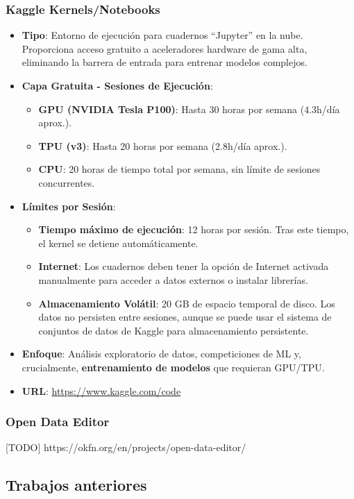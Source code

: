 \subsubsection*{Kaggle Kernels/Notebooks}
\begin{itemize}
	\item \textbf{Tipo}: Entorno de ejecución para cuadernos ``Jupyter'' en la nube. Proporciona acceso gratuito a aceleradores hardware de gama alta, eliminando la barrera de entrada para entrenar modelos complejos.
	\item \textbf{Capa Gratuita - Sesiones de Ejecución}:
	\begin{itemize}
		\item \textbf{GPU (NVIDIA Tesla P100)}: Hasta 30 horas por semana (4.3h/día aprox.).
		\item \textbf{TPU (v3)}: Hasta 20 horas por semana (2.8h/día aprox.).
		\item \textbf{CPU}: 20 horas de tiempo total por semana, sin límite de sesiones concurrentes.
	\end{itemize}
	\item \textbf{Límites por Sesión}:
	\begin{itemize}
		\item \textbf{Tiempo máximo de ejecución}: 12 horas por sesión. Tras este tiempo, el kernel se detiene automáticamente.
		\item \textbf{Internet}: Los cuadernos deben tener la opción de Internet activada manualmente para acceder a datos externos o instalar librerías.
		\item \textbf{Almacenamiento Volátil}: 20 GB de espacio temporal de disco. Los datos no persisten entre sesiones, aunque se puede usar el sistema de conjuntos de datos de Kaggle para almacenamiento persistente.
	\end{itemize}
	\item \textbf{Enfoque}: Análisis exploratorio de datos, competiciones de ML y, crucialmente, \textbf{entrenamiento de modelos} que requieran GPU/TPU.
	\item \textbf{URL}: \url{https://www.kaggle.com/code}
\end{itemize}

\subsubsection*{Open Data Editor}
[TODO]  https://okfn.org/en/projects/open-data-editor/


	\subsection{Trabajos anteriores}



